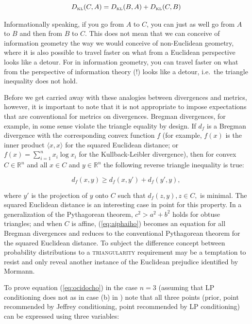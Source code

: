 \documentclass[smallextended]{svjour3}       %
\begin{document}
\begin{equation}
  \label{eq:ocidocho}
  D_{\mbox{\tiny KL}}(C,A)=D_{\mbox{\tiny KL}}(B,A)+D_{\mbox{\tiny KL}}(C,B)
\end{equation}

Informationally speaking, if you go from $A$ to $C$, you can just as
well go from $A$ to $B$ and then from $B$ to $C$. This does not mean
that we can conceive of information geometry the way we would conceive
of non-Euclidean geometry, where it is also possible to travel faster
on what from a Euclidean perspective looks like a detour. For in
information geometry, you can travel faster on what from the
perspective of information theory (!) looks like a detour, i.e.\ the
triangle inequality does not hold. 

Before we get carried away with these analogies between divergences
and metrics, however, it is important to note that it is not
appropriate to impose expectations that are conventional for metrics
on divergences. Bregman divergences, for example, in some sense
violate the triangle equality by design. If $d_{f}$ is a Bregman
divergence with the corresponding convex function $f$ (for example,
$f(x)$ is the inner product $\langle{}x,x\rangle$ for the squared
Euclidean distance; or $f(x)=\sum_{i=1}^{n}{}x_{i}\log{}x_{i}$ for the
Kullback-Leibler divergence), then for convex $C\in\mathbb{R}^{n}$ and
all $x\in{}C$ and $y\in\mathbb{R}^{n}$ the following reverse triangle
inequality is true: 

\begin{equation}
\label{eq:aiphaiho}
d_{f}(x,y)\geq{}d_{f}(x,y')+d_{f}(y',y), 
\end{equation}

{\noindent}where $y'$ is the projection of $y$ onto $C$ such that
$d_{f}(z,y),z\in{}C,$ is minimal. The squared Euclidean distance is an
interesting case in point for this property. In a generalization of
the Pythagorean theorem, $c^{2}>a^{2}+b^{2}$ holds for obtuse
triangles; and when $C$ is affine, (\ref{eq:aiphaiho}) becomes an
equation for all Bregman divergences and reduces to the conventional
Pythagorean theorem for the squared Euclidean distance. To subject the
difference concept between probability distributions to a
\textsc{triangularity} requirement may be a temptation to resist and
only reveal another instance of the Euclidean prejudice identified by
Mormann.

To prove equation (\ref{eq:ocidocho}) in the case $n=3$ (assuming that
LP conditioning does not  as in case (b) in
) note that all three points
(prior, point recommended by Jeffrey conditioning, point recommended
by LP conditioning) can be expressed using three variables:
\end{document}
